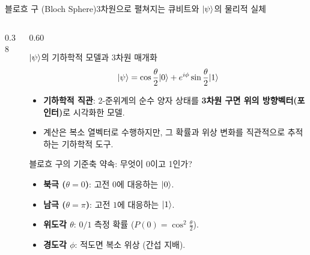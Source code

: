 \documentclass[aspectratio=169, 10pt]{beamer}
\begin{document}
\begin{frame}{블로흐 구 (Bloch Sphere)}{3차원으로 펼쳐지는 큐비트와 $|\psi\rangle$의 물리적 실체}
\begin{columns}[c,onlytextwidth]
\begin{column}{0.38\textwidth}
    \end{column}
    \begin{column}{0.60\textwidth}
        \begin{block}{$|\psi\rangle$의 기하학적 모델과 3차원 매개화}
            $$|\psi\rangle = \cos\frac{\theta}{2}|0\rangle + e^{i\phi}\sin\frac{\theta}{2}|1\rangle$$
            \begin{itemize}\setlength{\itemsep}{1pt}
                \item \textbf{기하학적 직관}: 2-준위계의 순수 양자 상태를 \textbf{3차원 구면 위의 방향벡터(포인터)}로 시각화한 모델.
                \item 계산은 복소 열벡터로 수행하지만, 그 확률과 위상 변화를 직관적으로 추적하는 기하학적 도구.
            \end{itemize}
        \end{block}
        \vspace{0.08cm}
        \begin{exampleblock}{블로흐 구의 기준축 약속: 무엇이 0이고 1인가?}
            \begin{itemize}\setlength{\itemsep}{1pt}
                \item \textbf{북극 ($\theta=0$)}: 고전 $0$에 대응하는 \textbf{$|0\rangle$}.
                \item \textbf{남극 ($\theta=\pi$)}: 고전 $1$에 대응하는 \textbf{$|1\rangle$}.
                \item \textbf{위도각 $\theta$}: $0/1$ 측정 확률 ($P(0)=\cos^2\frac{\theta}{2}$).
                \item \textbf{경도각 $\phi$}: 적도면 복소 위상 (간섭 지배).
            \end{itemize}
        \end{exampleblock}
    \end{column}
    \end{columns}
\end{frame}
\end{document}
